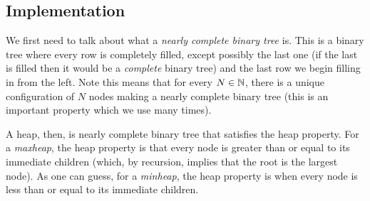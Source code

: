 \subsection{Implementation}
We first need to talk about what a \textit{nearly complete binary tree} is. This is a binary tree where every row is completely filled, except possibly the last one (if the last is filled then it would be a \textit{complete} binary tree) and the last row we begin filling in from the left. Note this means that for every $N \in \mathbb{N}$, there is a unique configuration of $N$ nodes making a nearly complete binary tree (this is an important property which we use many times).

A heap, then, is nearly complete binary tree that satisfies the heap property. For a \textit{maxheap}, the heap property is that every node is greater than or equal to its immediate children (which, by recursion, implies that the root is the largest node). As one can guess, for a \textit{minheap}, the heap property is when every node is less than or equal to its immediate children.

